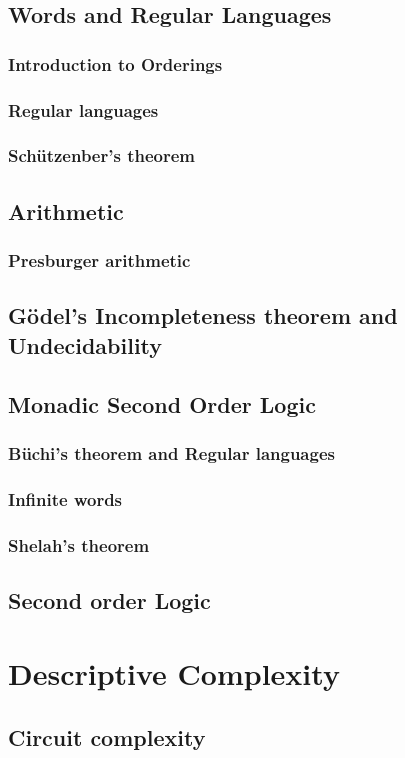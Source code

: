 \chapter{Words and Regular Languages}
\section{Introduction to Orderings}
\section{Regular languages}
\section{Sch\"utzenber's theorem}
\chapter{Arithmetic}
\section{Presburger arithmetic}
\chapter{G\"odel's Incompleteness theorem and Undecidability}
\chapter{Monadic Second Order Logic}
\section{B\"uchi's theorem and Regular languages}
\section{Infinite words}
\section{Shelah's theorem}
\chapter{Second order Logic}

\part{Descriptive Complexity}
\chapter{Circuit complexity}
